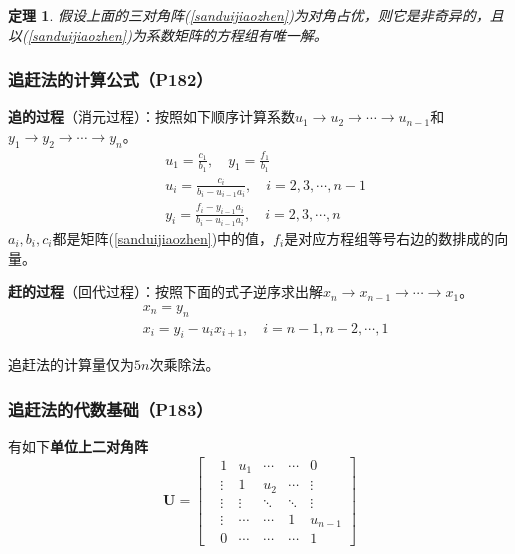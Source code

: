 \documentclass[fontset=ubuntu]{ctexart}
\newtheorem{theorem}{定理}
\numberwithin{equation}{section}
\numberwithin{theorem}{section}
\begin{document}
\begin{multicols}{2}
    \begin{theorem}
        假设上面的三对角阵(\ref{sanduijiaozhen})为对角占优，则它是非奇异的，且以(\ref{sanduijiaozhen})为系数矩阵的方程组有唯一解。
    \end{theorem}

    \subsubsection{追赶法的计算公式（P182）}

    \textbf{追的过程}（消元过程）：按照如下顺序计算系数$u_1\to u_2\to\cdots\to u_{n-1}$和$y_1\to y_2\to\cdots\to y_n$。
    \begin{align}
        & u_1 = \frac{c_1}{b_1},\quad y_1=\frac{f_1}{b_1} \nonumber \\
        & u_i = \frac{c_i}{b_i-u_{i-1}a_i},\quad i = 2,3,\cdots,n-1 \\
        & y_i = \frac{f_i-y_{i-1}a_i}{b_i-u_{i-1}a_i},\quad i = 2,3,\cdots,n \nonumber
    \end{align}
    $a_i,b_i,c_i$都是矩阵(\ref{sanduijiaozhen})中的值，$f_i$是对应方程组等号右边的数排成的向量。

    \textbf{赶的过程}（回代过程）：按照下面的式子逆序求出解$x_n\to x_{n-1}\to\cdots\to x_1$。
    \begin{align}
        & x_n = y_n \nonumber \\
        & x_i = y_i - u_i x_{i+1},\quad i = n-1, n-2, \cdots, 1
    \end{align}

    追赶法的计算量仅为$5n$次乘除法。

    \subsubsection{追赶法的代数基础（P183）}

    有如下\textbf{单位上二对角阵}
    \begin{equation}
        \mathbf{U}=
        \begin{bmatrix}
            &1  &u_1 &\cdots &\cdots &0 \\ 
            &\vdots &1 &u_2 &\cdots &\vdots \\
            &\vdots &\vdots &\ddots &\ddots &\vdots \\
            &\vdots &\cdots &\cdots &1 &u_{n-1} \\
            &0 &\cdots &\cdots &\cdots & 1
        \end{bmatrix}
    \end{equation}


\end{multicols}
\end{document}

